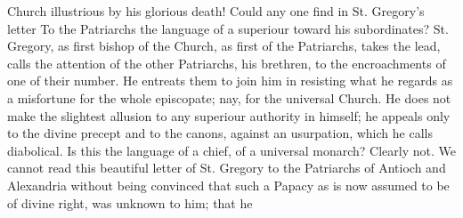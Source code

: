 Church illustrious by his glorious death! Could any one find in St. Gregory's letter To the Patriarchs the language of a superiour toward his subordinates? St. Gregory, as first bishop of the Church, as first of the Patriarchs, takes the lead, calls the attention of the other Patriarchs, his brethren, to the encroachments of one of their number. He entreats them to join him in resisting what he regards as a misfortune for the whole episcopate; nay, for the universal Church. He does not make the slightest allusion to any superiour authority in himself; he appeals only to the divine precept and to the canons, against an usurpation, which he calls diabolical. Is this the language of a chief, of a universal monarch? Clearly not. We cannot read this beautiful letter of St. Gregory to the Patriarchs of Antioch and Alexandria without being convinced that such a Papacy as is now assumed to be of divine right, was unknown to him; that he

